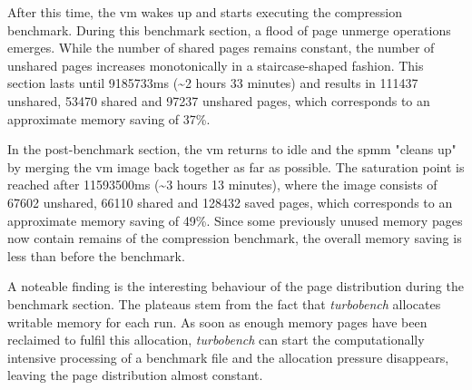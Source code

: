 After this time, the \ac{vm} wakes up and starts executing the compression benchmark.
During this benchmark section, a flood of page unmerge operations emerges.
While the number of shared pages remains constant, the number of unshared pages increases monotonically in a staircase-shaped fashion.
This section lasts until 9185733ms (\textasciitilde{}2 hours 33 minutes) and results in 111437 unshared, 53470 shared and 97237 unshared pages, which corresponds to an approximate memory saving of 37\%.

In the post-benchmark section, the \ac{vm} returns to idle and the \ac{spmm} "cleans up" by merging the \ac{vm} image back together as far as possible.
The saturation point is reached after 11593500ms (\textasciitilde{}3 hours 13 minutes), where the image consists of 67602 unshared, 66110 shared and 128432 saved pages, which corresponds to an approximate memory saving of 49\%.
Since some previously unused memory pages now contain remains of the compression benchmark, the overall memory saving is less than before the benchmark.

A noteable finding is the interesting behaviour of the page distribution during the benchmark section.
The plateaus stem from the fact that \textit{turbobench} allocates writable memory for each run.
As soon as enough memory pages have been reclaimed to fulfil this allocation, \textit{turbobench} can start the computationally intensive processing of a benchmark file and the allocation pressure disappears, leaving the page distribution almost constant.

